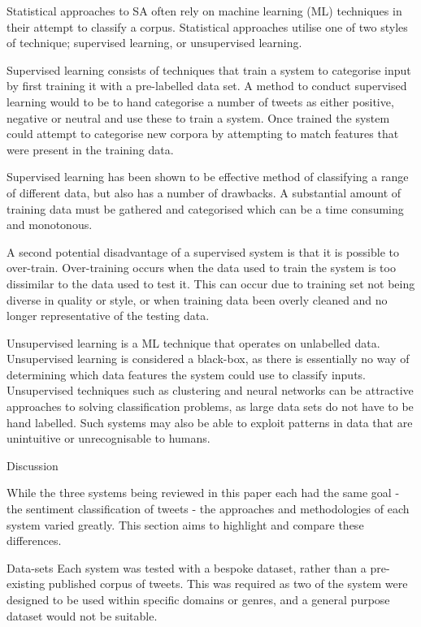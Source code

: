 Statistical approaches to SA often rely on machine learning
(ML) techniques in their attempt to classify a corpus.
Statistical approaches utilise one of two styles of technique;
supervised learning, or unsupervised learning.

Supervised learning consists of techniques that train a system to categorise input by first training it with a pre-labelled data set.
A method to conduct supervised learning would to be to hand categorise a
number of tweets as either positive, negative or neutral and use these to
train a system. 
Once trained the system could attempt to categorise new corpora
by attempting to match features that were present in the training data.

Supervised learning has been shown to be effective method of classifying a
range of different data, but also has a number of drawbacks. 
A substantial amount of training data must be gathered and categorised
which can be a time consuming and monotonous.

A second potential disadvantage of a supervised system is that it is possible to
over-train.
Over-training occurs when the data used to train the system is too dissimilar
to the data used to test it. 
This can occur due to training set not being diverse in quality or style, or
when training data been overly cleaned and no longer representative of
the testing data.

Unsupervised learning is a ML technique that operates on unlabelled data.
Unsupervised learning is considered a black-box, as there is essentially no
way of determining which data features the system could use to classify
inputs.
Unsupervised techniques such as clustering and neural networks can be
attractive approaches to solving classification problems, as large data sets
do not have to be hand labelled.
Such systems may also be able to exploit patterns in data that are unintuitive
or unrecognisable to humans.


Discussion


While the three systems being reviewed in this paper each had the same goal -
the sentiment classification of tweets - the approaches and methodologies of
each system varied greatly.  
This section aims to highlight and compare these differences.

Data-sets
Each system was tested with a bespoke dataset, rather than a pre-existing
published  corpus of tweets.  
This was required as two of the system were designed to be used within
specific domains or genres, and a general purpose dataset would not be
suitable.

